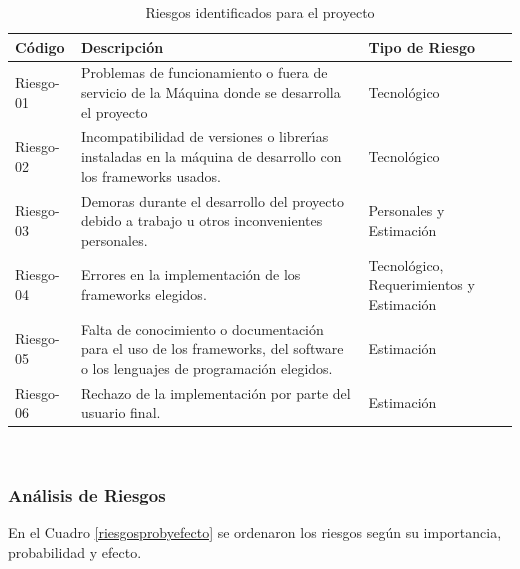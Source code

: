\begin{table}[h]
    \begin{tabular}{ | m{1.5cm} | m{7cm}| m{3.5cm}  |}
        \hline
        \rowcolor{lightgray}
        Código & Descripción & Tipo de Riesgo \\
        \hline
        Riesgo-01 & Problemas de funcionamiento o fuera de servicio de la Máquina donde se desarrolla el proyecto  & Tecnológico \\
        \hline
        Riesgo-02 & Incompatibilidad de versiones o librerı́as instaladas en la máquina de desarrollo con los frameworks usados.  &Tecnológico \\
        \hline
        Riesgo-03 & Demoras durante el desarrollo del proyecto debido a trabajo u otros inconvenientes personales.  &  Personales y Estimación\\
        \hline
        Riesgo-04 & Errores en la implementación de los frameworks elegidos.  & Tecnológico, Requerimientos y Estimación\\
        \hline
        Riesgo-05 & Falta de conocimiento o documentación para el uso de los frameworks, del software o los lenguajes de programación elegidos.  & Estimación\\
        \hline
        Riesgo-06 & Rechazo de la implementación por parte del usuario final.  & Estimación\\
        \hline
    \end{tabular}\\
    \caption{Riesgos identificados para el proyecto}
    \label{riesgosproyecto}
\end{table}

\newpage
\subsubsection{Análisis de Riesgos}

En el Cuadro \ref{riesgosprobyefecto} se ordenaron los riesgos según su importancia, probabilidad y efecto.

